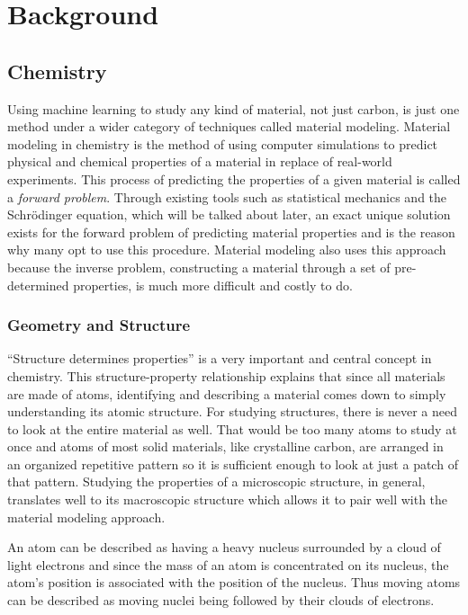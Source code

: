 \documentclass[12pt, abstract = true]{scrartcl}
\begin{document}
\newpage

\section{Background}

\subsection{Chemistry}

Using machine learning to study any kind of material, not just carbon, 
is just one method under a wider category of techniques called material modeling. 
Material modeling in chemistry is the method of using computer simulations to predict 
physical and chemical properties of a material in replace of real-world experiments. 
This process of predicting the properties of a given material is called a \emph{forward 
problem}. Through existing tools such as statistical mechanics and the Schrödinger 
equation, which will be talked about later, an exact unique solution exists for the 
forward problem of predicting material properties and is the reason why many opt to 
use this procedure. Material modeling also uses this approach because the inverse 
problem, constructing a material through a set of pre-determined properties, 
is much more difficult and costly to do.

\subsubsection{Geometry and Structure}
``Structure determines properties'' is a very important and central concept in chemistry. 
This structure-property relationship explains that since all materials are made of atoms, identifying 
and describing a material comes down to simply understanding its atomic structure. For studying 
structures, there is never a need to look at the entire material as well. That would be too many 
atoms to study at once and atoms of most solid materials, like crystalline carbon, are arranged in 
an organized repetitive pattern so it is sufficient enough to look at just a patch of that pattern. 
Studying the properties of a microscopic structure, in general, translates well to its macroscopic 
structure which allows it to pair well with the material modeling approach.


An atom can be described as having a heavy nucleus surrounded by a cloud of light 
electrons and since the mass of an atom is concentrated on its nucleus, the atom's 
position is associated with the position of the nucleus. Thus moving atoms can be described
as moving nuclei being followed by their clouds of electrons. 
\end{document}
